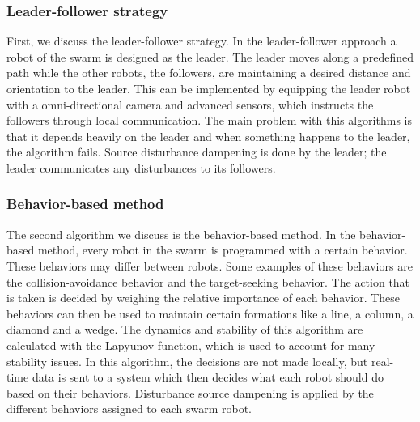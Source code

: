 \subsubsection{Leader-follower strategy}
First, we discuss the leader-follower strategy. 
In the leader-follower approach a robot of the swarm is designed as the leader.
The leader moves along a predefined path while the other robots, the followers, are maintaining a desired distance and orientation to the leader. \cite{consolini2008leader}
This can be implemented by equipping the leader robot with a omni-directional camera and advanced sensors, which instructs the followers through local communication. \cite{das2002vision}
The main problem with this algorithms is that it depends heavily on the leader and when something happens to the leader, the algorithm fails. 
Source disturbance dampening is done by the leader; the leader communicates any disturbances to its followers.

\subsubsection{Behavior-based method}
The second algorithm we discuss is the behavior-based method. 
In the behavior-based method, every robot in the swarm is programmed with a certain behavior. 
These behaviors may differ between robots.
Some examples of these behaviors are the collision-avoidance behavior and the target-seeking behavior. 
The action that is taken is decided by weighing the relative importance of each behavior. \cite{consolini2008leader}
These behaviors can then be used to maintain certain formations like a line, a column, a diamond and a wedge. \cite{balch1998behavior}
The dynamics and stability of this algorithm are calculated with the Lapyunov function, which is used to account for many stability issues. \cite{lawton2003decentralized}
In this algorithm, the decisions are not made locally, but real-time data is sent to a system which then decides what each robot should do based on their behaviors.
Disturbance source dampening is applied by the different behaviors assigned to each swarm robot.

